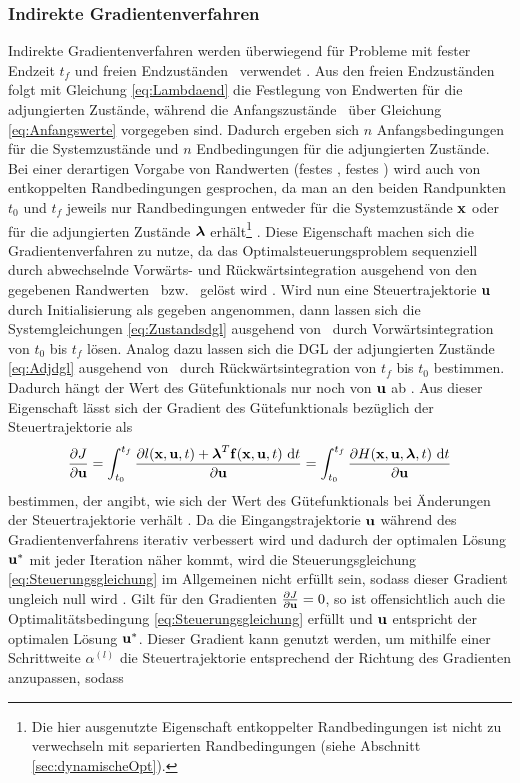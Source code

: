 \subsubsection{Indirekte Gradientenverfahren}\label{subsubsec:Gradientenverfahren_indirekt}
Indirekte Gradientenverfahren werden überwiegend für Probleme mit fester Endzeit $t_f$ und freien Endzuständen \xoftf~verwendet \cite{KnutGraichen.2012}. Aus den freien Endzuständen folgt mit Gleichung \eqref{eq:Lambdaend} die Festlegung von Endwerten für die adjungierten Zustände, während die Anfangszustände \xzero~über Gleichung \eqref{eq:Anfangswerte} vorgegeben sind. Dadurch ergeben sich $n$ Anfangsbedingungen für die Systemzustände und $n$ Endbedingungen für die adjungierten Zustände. Bei einer derartigen Vorgabe von Randwerten (festes \xoftzero, festes \lambdaoftf) wird auch von entkoppelten Randbedingungen gesprochen, da man an den beiden Randpunkten $t_0$ und $t_f$ jeweils nur Randbedingungen entweder für die Systemzustände $\boldsymbol{\mathrm{x}}$ oder für die adjungierten Zustände $\boldsymbol{\mathrm{\lambda}}$ erhält\footnote{Die hier ausgenutzte Eigenschaft entkoppelter Randbedingungen ist nicht zu verwechseln mit separierten Randbedingungen (siehe Abschnitt \ref{sec:dynamischeOpt}).} \cite{KnutGraichen.2012}. Diese Eigenschaft machen sich die Gradientenverfahren zu nutze, da das Optimalsteuerungsproblem sequenziell durch abwechselnde Vorwärts- und Rückwärtsintegration ausgehend von den gegebenen Randwerten \xoftzero~bzw. \lambdaoftf~gelöst wird \cite{KnutGraichen.2012}. Wird nun eine Steuertrajektorie $\boldsymbol{\mathrm{u}}$ durch Initialisierung als gegeben angenommen, dann lassen sich die Systemgleichungen \eqref{eq:Zustandsdgl} ausgehend von \xzero~durch Vorwärtsintegration von $t_0$ bis $t_f$ lösen. Analog dazu lassen sich die \gls{DGL} der adjungierten Zustände \eqref{eq:Adjdgl} ausgehend von \lambdaoftf~durch Rückwärtsintegration von $t_f$ bis $t_0$ bestimmen. Dadurch hängt der Wert des Gütefunktionals nur noch von $\boldsymbol{\mathrm{u}}$ ab \cite{Papageorgiou.2012}. Aus dieser Eigenschaft lässt sich der Gradient des Gütefunktionals bezüglich der Steuertrajektorie als
\begin{equation}
	\frac{\partial J}{\partial \boldsymbol{\mathrm{u}}} = \int_{t_0}^{t_f}\frac{\partial l(\boldsymbol{\mathrm{x}},\boldsymbol{\mathrm{u}},t) + \boldsymbol{\mathrm{\lambda}}^T\boldsymbol{\mathrm{f}}(\boldsymbol{\mathrm{x}},\boldsymbol{\mathrm{u}},t)~\textrm{d}{t}}{\partial \boldsymbol{\mathrm{u}}} = \int_{t_0}^{t_f}\frac{\partial H(\boldsymbol{\mathrm{x}},\boldsymbol{\mathrm{u}},\boldsymbol{\mathrm{\lambda}},t)~\textrm{d}{t}}{\partial \boldsymbol{\mathrm{u}}}
\end{equation}
bestimmen, der angibt, wie sich der Wert des Gütefunktionals bei Änderungen der Steuertrajektorie verhält \cite{Papageorgiou.2012}. Da die Eingangstrajektorie $\boldsymbol{\mathrm{u}}$ während des Gradientenverfahrens iterativ verbessert wird und dadurch der optimalen Lösung $\boldsymbol{\mathrm{u}}^*$ mit jeder Iteration näher kommt, wird die Steuerungsgleichung \eqref{eq:Steuerungsgleichung} im Allgemeinen nicht erfüllt sein, sodass dieser Gradient ungleich null wird \cite{KnutGraichen.2012}. Gilt für den Gradienten $\frac{\partial J}{\partial \boldsymbol{\mathrm{u}}} = 0$, so ist offensichtlich auch die Optimalitätsbedingung \eqref{eq:Steuerungsgleichung} erfüllt und $\boldsymbol{\mathrm{u}}$ entspricht der optimalen Lösung $\boldsymbol{\mathrm{u}}^*$. Dieser Gradient kann genutzt werden, um mithilfe einer Schrittweite $\alpha^{(l)}$ die Steuertrajektorie entsprechend der Richtung des Gradienten anzupassen, sodass  
